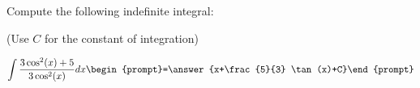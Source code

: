 \documentclass{ximera}
\author{Jim Talamo}
\begin{document}
\begin{exercise}
Compute the following indefinite integral:

\begin{prompt} (Use $C$ for the constant of integration) \end{prompt}

\[
\int \frac{3\cos^2(x)+5}{3\cos^2(x)} dx 
\begin{prompt}=\answer{x+\frac{5}{3} \tan(x)+C}\end{prompt}
\]
\end{exercise}
\end{document}
